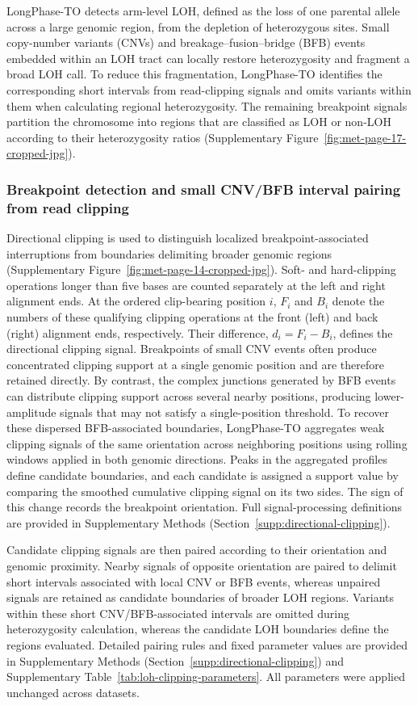 \documentclass[unnumsec,webpdf,contemporary,large]{oup-authoring-template}
\begin{document}
LongPhase-TO detects arm-level LOH, defined as the loss of one parental allele across a large genomic region, from the depletion of heterozygous sites. Small copy-number variants (CNVs) and breakage--fusion--bridge (BFB) events embedded within an LOH tract can locally restore heterozygosity and fragment a broad LOH call. To reduce this fragmentation, LongPhase-TO identifies the corresponding short intervals from read-clipping signals and omits variants within them when calculating regional heterozygosity. The remaining breakpoint signals partition the chromosome into regions that are classified as LOH or non-LOH according to their heterozygosity ratios (Supplementary Figure~\ref{fig:met-page-17-cropped-jpg}).

\subsubsection{Breakpoint detection and small CNV/BFB interval pairing from read clipping}

Directional clipping is used to distinguish localized breakpoint-associated interruptions from boundaries delimiting broader genomic regions (Supplementary Figure~\ref{fig:met-page-14-cropped-jpg}). Soft- and hard-clipping operations longer than five bases are counted separately at the left and right alignment ends. At the ordered clip-bearing position \(i\), \(F_i\) and \(B_i\) denote the numbers of these qualifying clipping operations at the front (left) and back (right) alignment ends, respectively. Their difference, \(d_i=F_i-B_i\), defines the directional clipping signal.
Breakpoints of small CNV events often produce concentrated clipping support at a single genomic position and are therefore retained directly. By contrast, the complex junctions generated by BFB events can distribute clipping support across several nearby positions, producing lower-amplitude signals that may not satisfy a single-position threshold. To recover these dispersed BFB-associated boundaries, LongPhase-TO aggregates weak clipping signals of the same orientation across neighboring positions using rolling windows applied in both genomic directions. Peaks in the aggregated profiles define candidate boundaries, and each candidate is assigned a support value by comparing the smoothed cumulative clipping signal on its two sides. The sign of this change records the breakpoint orientation. Full signal-processing definitions are provided in Supplementary Methods (Section~\ref{supp:directional-clipping}).

Candidate clipping signals are then paired according to their orientation and genomic proximity. Nearby signals of opposite orientation are paired to delimit short intervals associated with local CNV or BFB events, whereas unpaired signals are retained as candidate boundaries of broader LOH regions. Variants within these short CNV/BFB-associated intervals are omitted during heterozygosity calculation, whereas the candidate LOH boundaries define the regions evaluated. Detailed pairing rules and fixed parameter values are provided in Supplementary Methods (Section~\ref{supp:directional-clipping}) and Supplementary Table~\ref{tab:loh-clipping-parameters}. All parameters were applied unchanged across datasets.
\end{document}

